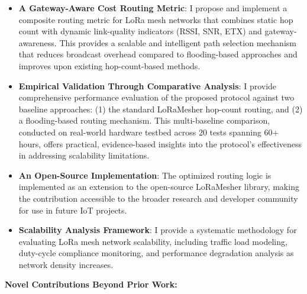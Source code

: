 \begin{itemize}
\item \textbf{A Gateway-Aware Cost Routing Metric}: I propose and implement a composite routing metric for LoRa mesh networks that combines static hop count with dynamic link-quality indicators (RSSI, SNR, ETX) and gateway-awareness. This provides a scalable and intelligent path selection mechanism that reduces broadcast overhead compared to flooding-based approaches and improves upon existing hop-count-based methods.

\item \textbf{Empirical Validation Through Comparative Analysis}: I provide comprehensive performance evaluation of the proposed protocol against two baseline approaches: (1) the standard LoRaMesher hop-count routing, and (2) a flooding-based routing mechanism. This multi-baseline comparison, conducted on real-world hardware testbed across 20 tests spanning 60+ hours, offers practical, evidence-based insights into the protocol's effectiveness in addressing scalability limitations.

\item \textbf{An Open-Source Implementation}: The optimized routing logic is implemented as an extension to the open-source LoRaMesher library, making the contribution accessible to the broader research and developer community for use in future IoT projects.

\item \textbf{Scalability Analysis Framework}: I provide a systematic methodology for evaluating LoRa mesh network scalability, including traffic load modeling, duty-cycle compliance monitoring, and performance degradation analysis as network density increases.
\end{itemize}

\textbf{Novel Contributions Beyond Prior Work:}

